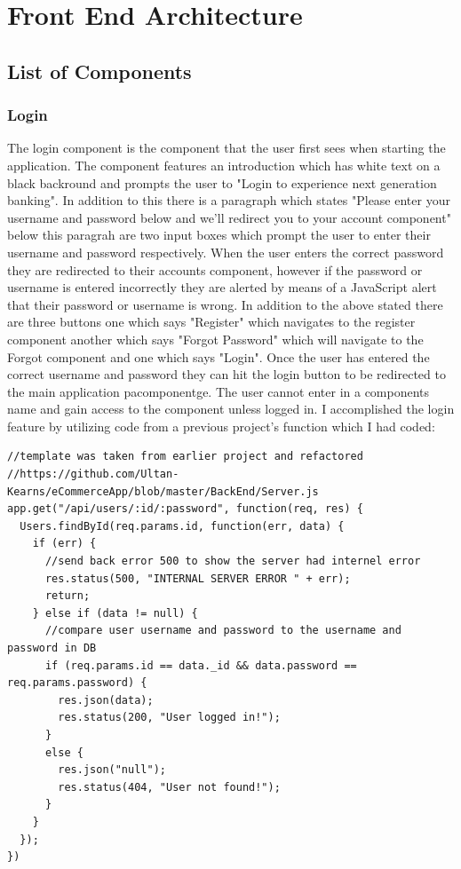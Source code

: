 \section{Front End Architecture}
\subsection{List of Components}
\subsubsection{Login}
The login component is the component that the user first sees when starting the application.  The component features an introduction which has white text on a black backround and prompts the user to "Login to experience next generation banking".  In addition to this there is a paragraph which states "Please enter your username and password below and we'll redirect you to your account component"  below this paragrah are two input boxes which prompt the user to enter their username and password respectively.  When the user enters the correct password they are redirected to their accounts component, however if the password or username is entered incorrectly they are alerted by means of a JavaScript alert that their password or username is wrong.  In addition to the above stated there are three buttons one which says "Register" which navigates to the register component another which says "Forgot Password" which will navigate to the Forgot component and one which says "Login".  Once the user has entered the correct username and password they can hit the login button to be redirected to the main application pacomponentge.  The user cannot enter in a components name and gain access to the component unless logged in.  I accomplished the login feature by utilizing code from a previous project's function which I had coded:
\begin{verbatim}
//template was taken from earlier project and refactored
//https://github.com/Ultan-Kearns/eCommerceApp/blob/master/BackEnd/Server.js
app.get("/api/users/:id/:password", function(req, res) {
  Users.findById(req.params.id, function(err, data) {
    if (err) {
      //send back error 500 to show the server had internel error
      res.status(500, "INTERNAL SERVER ERROR " + err);
      return;
    } else if (data != null) {
      //compare user username and password to the username and password in DB
      if (req.params.id == data._id && data.password == req.params.password) {
        res.json(data);
        res.status(200, "User logged in!");
      }
      else {
        res.json("null");
        res.status(404, "User not found!");
      }
    }
  });
})
\end{verbatim}
